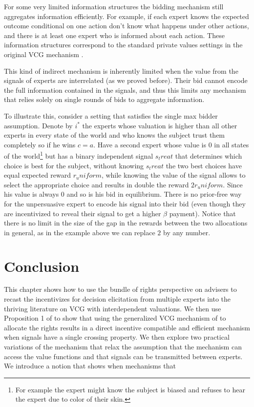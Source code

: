  For some very limited information structures the bidding mechanism still aggregates information efficiently. 
 For example, if each expert knows the expected outcome conditional on one action don't know what happens under other actions, and there is at least one expert who is informed about each action. These information structures correspond to the standard private values settings in the original VCG mechanism \cite{vickrey1961}.
 
 This kind of indirect mechanism is inherently limited when the value from the signals of experts are interrelated (as we proved before). Their bid cannot encode the full information contained in the signals, and thus this limits any mechanism that relies solely on single rounds of bids to aggregate information.
 
 To illustrate this, consider a setting that satisfies the single max bidder assumption. Denote by $i^*$ the experts whose valuation is higher than all other experts in every state of the world and who knows the subject trust them completely so if he wins $c=a$. Have a second expert whose value is $0$ in all states of the world\footnote{For example the expert might know the subject is biased and refuses to hear the expert due to color of their skin.} but has a binary independent signal $s_treat$ that determines which choice is best for the subject, without knowing $s_treat$ the two best choices have equal expected reward $r_uniform$, while knowing the value of the signal allows to select the appropriate choice and results in double the reward $2r_uniform$.
 Since his value is always 0 and so is his bid in equilibrium. 
 There is no prior-free way for the unpersuasive expert to encode his signal into their bid (even though they are incentivized to reveal their signal to get a higher $\beta$ payment). 
 Notice that there is no limit in the size of the gap in the rewards between the two allocations in general, as in the example above we can replace $2$ by any number.
 
 

\section{Conclusion}

This chapter shows how to use the bundle of rights perspective on advisers to recast the incentivizes for decision elicitation from multiple experts into the thriving literature on VCG with interdependent valuations.
We then use Proposition 1 of \cite{roughgarden2016optimal} to show that using the generalized VCG mechanism of \cite{maskin1992auctions} to allocate the rights results in a direct incentive compatible and efficient mechanism when signals have a single crossing property.
We then explore two practical variations of the mechanism that relax the assumption that the mechanism can access the value functions and that signals can be transmitted between experts.
We introduce a notion that shows when mechanisms that 

